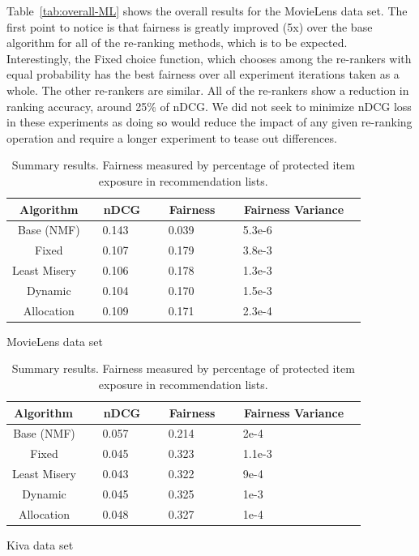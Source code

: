 Table~\ref{tab:overall-ML} shows the overall results for the MovieLens data set. The first point to notice is that fairness is greatly improved (5x) over the base algorithm for all of the re-ranking methods, which is to be expected. Interestingly, the Fixed choice function, which chooses among the re-rankers with equal probability has the best fairness over all experiment iterations taken as a whole. The other re-rankers are similar. All of the re-rankers show a reduction in ranking accuracy, around 25\% of nDCG. We did not seek to minimize nDCG loss in these experiments as doing so would reduce the impact of any given re-ranking operation and require a longer experiment to tease out differences.

\begin{table}[htb]
\setlength\tabcolsep{0pt}
    \begin{subtable}{.5\textwidth}
    \centering
    \begin{tabular}{c|l|l|l}
       Algorithm  & \ nDCG \ & \ Fairness \  & \ Fairness Variance \ \\
       \hline
       Base (NMF)       & \ 0.143 & \ 0.039 & \ 5.3e-6 \  \\
       Fixed            & \ 0.107 & \ 0.179 & \ 3.8e-3 \ \\
       Least Misery \   & \ 0.106 & \ 0.178 & \ 1.3e-3 \ \\
       Dynamic          & \ 0.104 & \ 0.170 & \ 1.5e-3 \ \\
       Allocation       & \ 0.109 & \ 0.171 & \ 2.3e-4 \ \\
    \end{tabular}
    \caption{MovieLens data set}
    \label{tab:overall-ML}
 \end{subtable}%
   \begin{subtable}{.5\textwidth}
    \centering
    \begin{tabular}{c|l|l|l}
       Algorithm  \ & \ nDCG \ & \ Fairness \ & \ Fairness Variance \ \\
       \hline
       Base (NMF)   \ & \ 0.057 & \ 0.214 & \ 2e-4\\
       Fixed        \ & \ 0.045 & \ 0.323 & \ 1.1e-3\\
       Least Misery \ & \ 0.043 & \ 0.322 & \ 9e-4\\
       Dynamic      \ & \ 0.045 & \ 0.325 & \ 1e-3\\
       Allocation   \ & \ 0.048 & \ 0.327 & \ 1e-4\\
    \end{tabular}
    \caption{Kiva data set}
    \label{tab:overall-Kiva}
    \end{subtable}
    \caption{Summary results. Fairness measured by percentage of protected item exposure in recommendation lists.}
\end{table}

